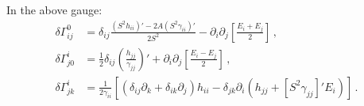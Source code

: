 \documentclass{article}
\newcommand*\p[1]{\left(#1\right)}
\newcommand*\ps[1]{\left[#1\right]}
\newcommand*\f[2]{\frac{#1}{#2}}
\begin{document}
In the above gauge:
\begin{align}
\delta\Gamma^0_{ij}&=\delta_{ij}\f{\p{S^2 h_{ii}}'-2A\p{S^2\gamma_{ii}}'}{2S^2}-\partial_i\partial_j\ps{\f{E_i+E_j}{2}}\,,\\
\delta\Gamma^i_{j0}&=\f12\delta_{ij}\p{\f{h_{jj}}{\gamma_{jj}}}'+\partial_i\partial_j\ps{\f{E_i-E_j}{2}}\,,\\
\delta\Gamma^i_{jk}&=\f{1}{2\gamma_{ii}}\ps{\p{\delta_{ij}\partial_k+\delta_{ik}\partial_j}h_{ii}-\delta_{jk}\partial_i\p{h_{jj}+\ps{S^2\gamma_{jj}}'E_i}}\,.
\end{align} 
\end{document}
